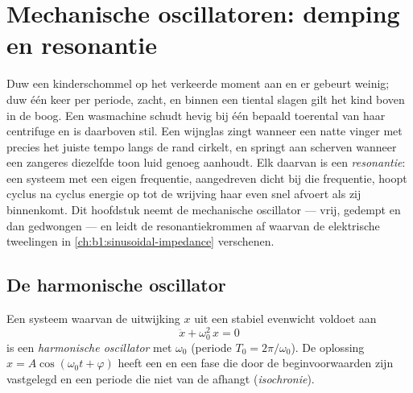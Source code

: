 \chapter{Mechanische oscillatoren: demping en resonantie}\label{ch:b1:oscillators-resonance}

Duw een kinderschommel op het verkeerde moment aan en er gebeurt weinig; duw
één keer per periode, zacht, en binnen een tiental slagen gilt het kind
boven in de boog. Een wasmachine schudt hevig bij één bepaald toerental
van haar centrifuge en is daarboven stil. Een wijnglas zingt wanneer een natte
vinger met precies het juiste tempo langs de rand cirkelt, en springt aan
scherven wanneer een zangeres diezelfde toon luid genoeg aanhoudt.
Elk daarvan is een \emph{resonantie}: een systeem met een eigen
frequentie, aangedreven dicht bij die frequentie, hoopt cyclus na cyclus
energie op tot de wrijving haar even snel afvoert als zij binnenkomt. Dit
hoofdstuk neemt de mechanische oscillator --- vrij, gedempt en dan gedwongen
--- en leidt de resonantiekrommen af waarvan de elektrische tweelingen in
\cref{ch:b1:sinusoidal-impedance} verschenen.

\section{De harmonische oscillator}

\begin{definition}\label{def:b1:oscillators-resonance:harmonic}
Een systeem waarvan de uitwijking $x$ uit een stabiel evenwicht voldoet aan
\[
\ddot x + \omega_0^2\,x = 0
\]
is een \emph{harmonische oscillator} met \emph{}
$\omega_0$ (periode $T_0 = 2\pi/\omega_0$). De oplossing $x = A\cos(\omega_0t
+ \varphi)$ heeft een  en een fase die door de beginvoorwaarden zijn vastgelegd
en een periode die niet van de  afhangt (\emph{isochronie}).
\end{definition}

